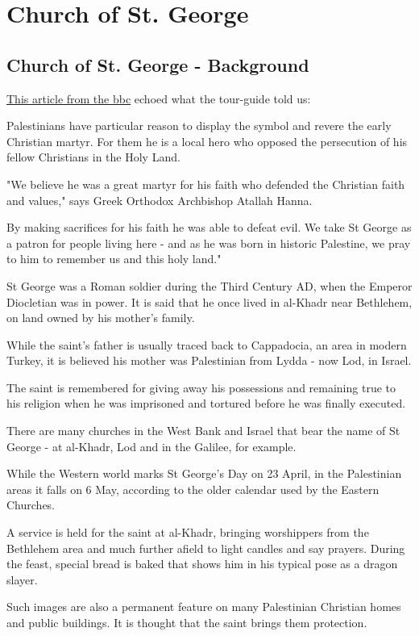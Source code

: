 \documentclass[letterpaper]{report}
\begin{document}
\section{Church of St. George}
\begin{multicols}{2}
\subsection{Church of St. George - Background}
\href{http://www.bbc.com/news/magazine-27048219}{
This article from the bbc}
echoed what the tour-guide told us:

Palestinians have particular reason to display the symbol and revere the early Christian martyr. For them he is a local hero who opposed the persecution of his fellow Christians in the Holy Land.

"We believe he was a great martyr for his faith who defended the Christian faith and values," says Greek Orthodox Archbishop Atallah Hanna.

By making sacrifices for his faith he was able to defeat evil. We take St George as a patron for people living here - and as he was born in historic Palestine, we pray to him to remember us and this holy land."

St George was a Roman soldier during the Third Century AD, when the Emperor Diocletian was in power. It is said that he once lived in al-Khadr near Bethlehem, on land owned by his mother's family.

While the saint's father is usually traced back to Cappadocia, an area in modern Turkey, it is believed his mother was Palestinian from Lydda - now Lod, in Israel.

The saint is remembered for giving away his possessions and remaining true to his religion when he was imprisoned and tortured before he was finally executed.

There are many churches in the West Bank and Israel that bear the name of St George - at al-Khadr, Lod and in the Galilee, for example.

While the Western world marks St George's Day on 23 April, in the Palestinian areas it falls on 6 May, according to the older calendar used by the Eastern Churches.

A service is held for the saint at al-Khadr, bringing worshippers from the Bethlehem area and much further afield to light candles and say prayers. During the feast, special bread is baked that shows him in his typical pose as a dragon slayer.

Such images are also a permanent feature on many Palestinian Christian homes and public buildings. It is thought that the saint brings them protection.


\end{multicols}
\end{document}

